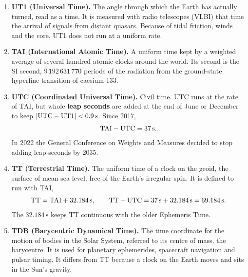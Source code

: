 \begin{enumerate}
	\item \textbf{UT1 (Universal Time).} The angle through which the Earth has actually turned, read as a time. It is measured with radio telescopes (VLBI) that time the arrival of signals from distant quasars. Because of tidal friction, winds and the core, UT1 does not run at a uniform rate.
	\item \textbf{TAI (International Atomic Time).} A uniform time kept by a weighted average of several hundred atomic clocks around the world. Its second is the SI second, $9\,192\,631\,770$ periods of the radiation from the ground-state hyperfine transition of caesium-133.
	\item \textbf{UTC (Coordinated Universal Time).} Civil time. UTC runs at the rate of TAI, but whole \textbf{leap seconds} are added at the end of June or December to keep $|\mathrm{UTC} - \mathrm{UT}1| < 0.9\,\mathrm s$. Since 2017,
	\[
	\mathrm{TAI} - \mathrm{UTC} = 37\,\mathrm{s}.
	\]
	In 2022 the General Conference on Weights and Measures decided to stop adding leap seconds by 2035.
	\item \textbf{TT (Terrestrial Time).} The uniform time of a clock on the geoid, the surface of mean sea level, free of the Earth's irregular spin. It is defined to run with TAI,
	\[
	\mathrm{TT} = \mathrm{TAI} + 32.184\,\mathrm{s}, \qquad \mathrm{TT} - \mathrm{UTC} = 37\,\mathrm{s}+32.184\,\mathrm{s} = 69.184\,\mathrm{s}.
	\]
	The $32.184\,\mathrm s$ keeps TT continuous with the older Ephemeris Time.
	\item \textbf{TDB (Barycentric Dynamical Time).} The time coordinate for the motion of bodies in the Solar System, referred to its centre of mass, the barycentre. It is used for planetary ephemerides, spacecraft navigation and pulsar timing. It differs from TT because a clock on the Earth moves and sits in the Sun's gravity.
\end{enumerate}

